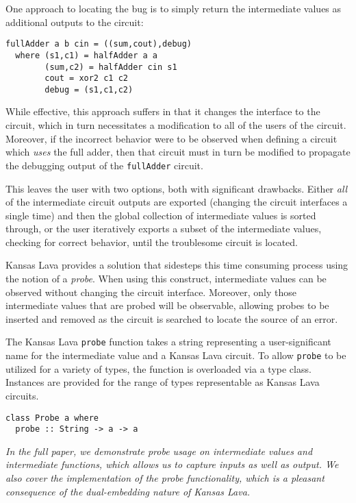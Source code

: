 \documentclass{llncs}
\begin{document}
One approach to locating the bug is to simply return the intermediate values as
additional outputs to the circuit:

\begin{verbatim}
fullAdder a b cin = ((sum,cout),debug)
  where (s1,c1) = halfAdder a a
        (sum,c2) = halfAdder cin s1
        cout = xor2 c1 c2
        debug = (s1,c1,c2)
\end{verbatim}

While effective, this approach suffers in that it changes the interface to the
circuit, which in turn necessitates a modification to all of the users of the
circuit. Moreover, if the incorrect behavior were to be observed when defining a
circuit which \emph{uses} the full adder, then that circuit must in turn be
modified to propagate the debugging output of the \verb!fullAdder! circuit.

This leaves the user with two options, both with
significant drawbacks. Either \emph{all} of the intermediate circuit outputs are
exported (changing the circuit interfaces a single time) and then the global
collection of intermediate values is sorted through, or the user 
iteratively exports a subset of the intermediate values, checking for correct
behavior, until the troublesome circuit is located.

Kansas Lava provides a solution that sidesteps this time consuming process
using the notion of a \emph{probe}. When using this construct,
intermediate values can be observed without changing the circuit
interface. Moreover, only those intermediate values that are probed will be
observable, allowing probes to be inserted and removed as the circuit is
searched to locate the source of an error.

The Kansas Lava \verb!probe! function takes a string representing a
user-significant name for the intermediate value and a Kansas Lava
circuit. To allow \verb!probe! to be utilized for a variety of types, the
function is overloaded via a type class. Instances are provided for the range of
types representable as Kansas Lava circuits.

\begin{verbatim}
class Probe a where
  probe :: String -> a -> a
\end{verbatim}

\emph{In the full paper, we demonstrate probe usage on intermediate values
and intermediate functions, which allows us to capture inputs as well as output.
We also cover the implementation of the probe functionality, which is a
pleasant consequence of the dual-embedding nature of Kansas Lava.}
\end{document}

